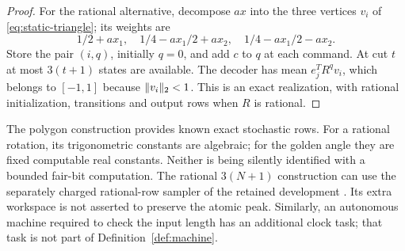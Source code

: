 \begin{proof}
For the rational alternative, decompose $a x$ into the three vertices
$v_i$ of \eqref{eq:static-triangle}; its weights are
\[
              1/2+a x_1,\quad 1/4-a x_1/2+a x_2,\quad
              1/4-a x_1/2-a x_2.
\]
Store the pair $(i,q)$, initially $q=0$, and add $c$ to $q$ at each
command. At cut $t$ at most $3(t+1)$ states are available. The decoder
has mean $e_j^TR^qv_i$, which belongs to $[-1,1]$ because
$\lVert v_i\rVert_2<1$. This is an exact realization, with rational
initialization, transitions and output rows when $R$ is rational.
\end{proof}

The polygon construction provides known exact stochastic rows. For a
rational rotation, its trigonometric constants are algebraic; for the
golden angle they are fixed computable real constants. Neither is being
silently identified with a bounded fair-bit computation. The rational
$3(N+1)$ construction can use the separately charged rational-row
sampler of the retained development \cite{GTF31}. Its extra workspace
is not asserted to preserve the atomic peak. Similarly, an autonomous
machine required to check the input length has an additional clock task;
that task is not part of Definition~\ref{def:machine}.
